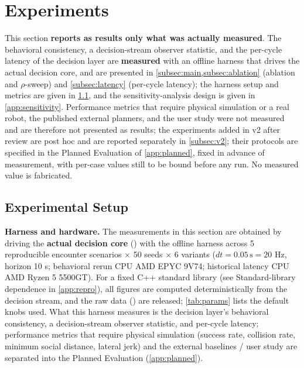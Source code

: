 \section{Experiments}\label{sec:exp}

This section \textbf{reports as results only what was actually measured}. The behavioral consistency, a decision-stream observer statistic, and the per-cycle latency of the decision layer are \textbf{measured} with an offline harness that drives the actual decision core, and are presented in \cref{subsec:main,subsec:ablation} (ablation and $\rho$-sweep) and \cref{subsec:latency} (per-cycle latency); the harness setup and metrics are given in \cref{subsec:setup}, and the sensitivity-analysis design is given in \cref{app:sensitivity}. Performance metrics that require physical simulation or a real robot, the published external planners, and the user study were not measured and are therefore not presented as results; the experiments added in v2 after review are post hoc and are reported separately in \cref{subsec:v2}; their protocols are specified in the Planned Evaluation of \cref{app:planned}, fixed in advance of measurement, with per-case values still to be bound before any run. No measured value is fabricated.

\subsection{Experimental Setup}\label{subsec:setup}

\noindent\textbf{Harness and hardware.} The measurements in this section are obtained by driving the \textbf{actual decision core} () with the  offline harness across 5 reproducible encounter scenarios $\times$ 50 seeds $\times$ 6 variants ($dt = 0.05\,\text{s} = 20$ Hz, horizon 10 s; behavioral rerun CPU AMD EPYC 9V74; historical latency CPU AMD Ryzen 5 5500GT). For a fixed C++ standard library (see Standard-library dependence in \cref{app:repro}), all figures are computed deterministically from the decision stream, and the raw data () are released; \cref{tab:params} lists the default knobs used. What this harness measures is the decision layer's behavioral consistency, a decision-stream observer statistic, and per-cycle latency; performance metrics that require physical simulation (success rate, collision rate, minimum social distance, lateral jerk) and the external baselines / user study are separated into the Planned Evaluation (\cref{app:planned}).

